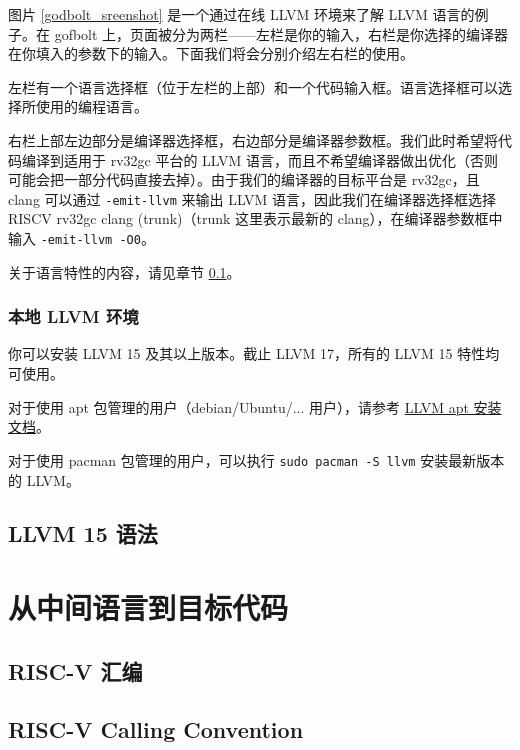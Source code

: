 图片 \ref{godbolt_sreenshot} 是一个通过在线 LLVM 环境来了解 LLVM 语言的例子。在
gofbolt 上，页面被分为两栏——左栏是你的输入，右栏是你选择的编译器在你填入的参数下的输入。下面我们将会分别介绍左右栏的使用。

左栏有一个语言选择框（位于左栏的上部）和一个代码输入框。语言选择框可以选择所使用的编程语言。

右栏上部左边部分是编译器选择框，右边部分是编译器参数框。我们此时希望将代码编译到适用于 rv32gc
平台的 LLVM 语言，而且不希望编译器做出优化（否则可能会把一部分代码直接去掉）。由于我们的编译器的目标平台是
rv32gc，且 clang 可以通过 \texttt{-emit-llvm} 来输出 LLVM 语言，因此我们在编译器选择框选择
RISCV rv32gc clang (trunk)（trunk 这里表示最新的 clang），在编译器参数框中输入 \texttt{-emit-llvm -O0}。

关于语言特性的内容，请见章节 \ref{LLVM}。

\subsubsection{本地 LLVM 环境}

你可以安装 LLVM 15 及其以上版本。截止 LLVM 17，所有的 LLVM 15 特性均可使用。

对于使用 apt 包管理的用户（debian/Ubuntu/... 用户），请参考 \href{https://apt.llvm.org/}{LLVM apt 安装文档}。

对于使用 pacman 包管理的用户，可以执行 \texttt{sudo pacman -S llvm} 安装最新版本的 LLVM。

\subsection{LLVM 15 语法}\label{LLVM}

\section{从中间语言到目标代码}

\subsection{RISC-V 汇编}

\subsection{RISC-V Calling Convention}
